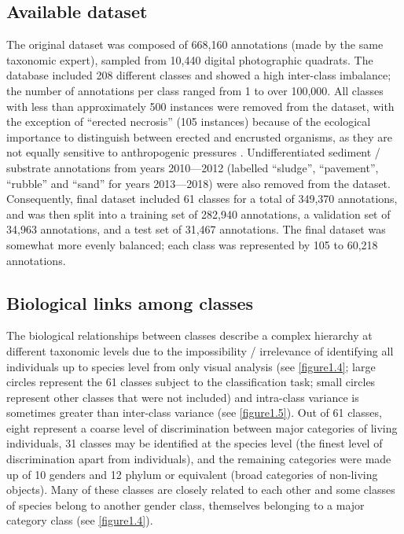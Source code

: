 \subsection{Available dataset}\label{chapitre1_3.2}
The original dataset was composed of 668,160 annotations (made by the same taxonomic expert), sampled from 10,440 digital photographic quadrats. The database included 208 different classes and showed a high inter-class imbalance; the number of annotations per class ranged from 1 to over 100,000. All classes with less than approximately 500 instances were removed from the dataset, with the exception of “erected necrosis” (105 instances) because of the ecological importance to distinguish between erected and encrusted organisms, as they are not equally sensitive to anthropogenic pressures \citep{sartoretto_integrated_2017}. Undifferentiated sediment / substrate annotations from years 2010---2012 (labelled “sludge”, “pavement”, “rubble” and “sand” for years 2013---2018) were also removed from the dataset. Consequently, final dataset included 61 classes for a total of 349,370 annotations, and was then split into a training set of 282,940 annotations, a validation set of 34,963 annotations, and a test set of 31,467 annotations. The final dataset was somewhat more evenly balanced; each class was represented by 105 to 60,218 annotations.

\subsection{Biological links among classes }\label{chapitre1_3.3}
The biological relationships between classes describe a complex hierarchy at different taxonomic levels due to the impossibility / irrelevance of identifying all individuals up to species level from only visual analysis (see \autoref{figure1.4}; large circles represent the 61 classes subject to the classification task; small circles represent other classes that were not included) and intra-class variance is sometimes greater than inter-class variance (see \autoref{figure1.5}). Out of 61 classes, eight represent a coarse level of discrimination between major categories of living individuals, 31 classes may be identified at the species level (the finest level of discrimination apart from individuals), and the remaining categories were made up of 10 genders and 12 phylum or equivalent (broad categories of non-living objects). Many of these classes are closely related to each other and some classes of species belong to another gender class, themselves belonging to a major category class (see \autoref{figure1.4}).


